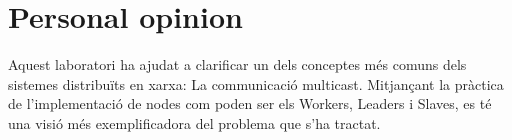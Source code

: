 \documentclass[a4paper, 10pt]{article}
\begin{document}
\section{Personal opinion}
    Aquest laboratori ha ajudat a clarificar un dels conceptes més comuns dels sistemes distribuïts en xarxa: La communicació multicast. Mitjançant la pràctica de l'implementació de nodes com poden ser els Workers, Leaders i Slaves, es té una visió més exemplificadora del problema que s'ha tractat.
\end{document}
